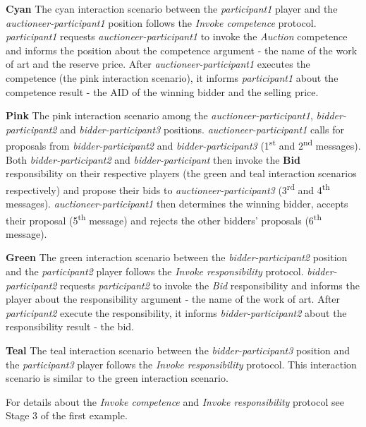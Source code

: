 \textbf{Cyan} The cyan interaction scenario between the \textit{participant1} player and the \textit{auctioneer-participant1} position follows the \textit{Invoke competence} protocol.
\textit{participant1} requests \textit{auctioneer-participant1} to invoke the \textit{Auction} competence and informs the position about the competence argument - the name of the work of art and the reserve price.
After \textit{auctioneer-participant1} executes the competence (the pink interaction scenario), it informs \textit{participant1} about the competence result - the AID of the winning bidder and the selling price.

\textbf{Pink} The pink interaction scenario among the \textit{auctioneer-participant1}, \textit{bidder-participant2} and \textit{bidder-participant3} positions.
\textit{auctioneer-participant1} calls for proposals from \textit{bidder-participant2} and \textit{bidder-participant3} (1\textsuperscript{st} and 2\textsuperscript{nd} messages).
Both \textit{bidder-participant2} and \textit{bidder-participant} then invoke the \textbf{Bid} responsibility on their respective players (the green and teal interaction scenarios respectively) and propose their bids to \textit{auctioneer-participant3} (3\textsuperscript{rd} and 4\textsuperscript{th} messages).
\textit{auctioneer-participant1} then determines the winning bidder, accepts their proposal (5\textsuperscript{th} message) and rejects the other bidders' proposals (6\textsuperscript{th} message).

\textbf{Green} The green interaction scenario between the \textit{bidder-participant2} position and the \textit{participant2} player follows the \textit{Invoke responsibility} protocol.
\textit{bidder-participant2} requests \textit{participant2} to invoke the \textit{Bid} responsibility and informs the player about the responsibility argument - the name of the work of art.
After \textit{participant2} execute the responsibility, it informs \textit{bidder-participant2} about the responsibility result - the bid.

\textbf{Teal} The teal interaction scenario between the \textit{bidder-participant3} position and the \textit{participant3} player follows the \textit{Invoke responsibility} protocol.
This interaction scenario is similar to the green interaction scenario.

For details about the \textit{Invoke competence} and \textit{Invoke responsibility} protocol see Stage 3 of the first example.